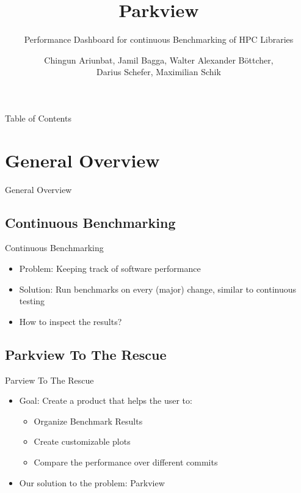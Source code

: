 \documentclass{beamer}
\title{Parkview}
\subtitle{Performance Dashboard for continuous Benchmarking of HPC Libraries}
\author{Chingun Ariunbat, Jamil Bagga, Walter Alexander B\"ottcher,\\Darius Schefer, Maximilian Schik}
\begin{document}
\maketitle

\begin{frame}{Table of Contents}
  \tableofcontents
\end{frame}

\section{General Overview}
\begin{frame}
  \begin{center}
    \Huge{General Overview}
  \end{center}
\end{frame}

\subsection{Continuous Benchmarking}
\begin{frame}{Continuous Benchmarking}
  \begin{itemize}
      \item Problem: Keeping track of software performance
      \item Solution: Run benchmarks on every (major) change, similar to continuous testing
      \item How to inspect the results?
  \end{itemize}
\end{frame}

\subsection{Parkview To The Rescue}
\begin{frame}{Parview To The Rescue}
  \begin{itemize}
      \item Goal: Create a product that helps the user to:
        \begin{itemize}
          \item Organize Benchmark Results
          \item Create customizable plots
          \item Compare the performance over different commits
        \end{itemize}
      \item Our solution to the problem: Parkview
  \end{itemize}
\end{frame}
\end{document}

